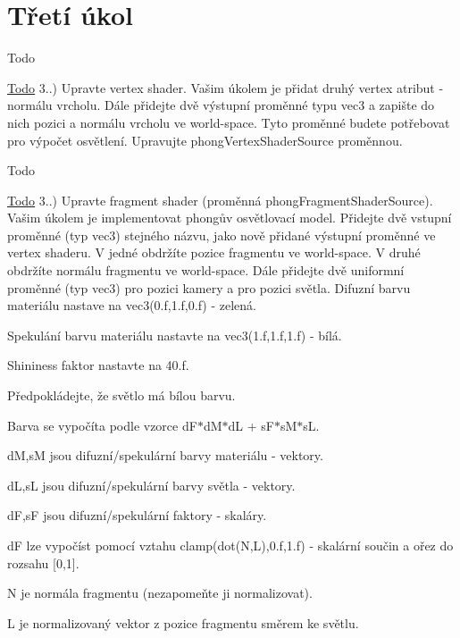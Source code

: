 \hypertarget{group__task3}{\section{Třetí úkol}
\label{group__task3}
}
\begin{DoxyRefDesc}{Todo}
\item[\hyperlink{todo__todo000002}{Todo}]3..) Upravte vertex shader. Vašim úkolem je přidat druhý vertex atribut -\/ normálu vrcholu. Dále přidejte dvě výstupní proměnné typu vec3 a zapište do nich pozici a normálu vrcholu ve world-\/space. Tyto proměnné budete potřebovat pro výpočet osvětlení. Upravujte phong\-Vertex\-Shader\-Source proměnnou. \end{DoxyRefDesc}


\begin{DoxyRefDesc}{Todo}
\item[\hyperlink{todo__todo000003}{Todo}]3..) Upravte fragment shader (proměnná phong\-Fragment\-Shader\-Source). Vašim úkolem je implementovat phongův osvětlovací model. Přidejte dvě vstupní proměnné (typ vec3) stejného názvu, jako nově přidané výstupní proměnné ve vertex shaderu. V jedné obdržíte pozice fragmentu ve world-\/space. V druhé obdržíte normálu fragmentu ve world-\/space. Dále přidejte dvě uniformní proměnné (typ vec3) pro pozici kamery a pro pozici světla. Difuzní barvu materiálu nastave na vec3(0.\-f,1.\-f,0.\-f) -\/ zelená.\par
 Spekulání barvu materiálu nastavte na vec3(1.\-f,1.\-f,1.\-f) -\/ bílá.\par
 Shininess faktor nastavte na 40.\-f.\par
 Předpokládejte, že světlo má bílou barvu.\par
 Barva se vypočíta podle vzorce d\-F$\ast$d\-M$\ast$d\-L + s\-F$\ast$s\-M$\ast$s\-L.\par
 d\-M,s\-M jsou difuzní/spekulární barvy materiálu -\/ vektory.\par
 d\-L,s\-L jsou difuzní/spekulární barvy světla -\/ vektory.\par
 d\-F,s\-F jsou difuzní/spekulární faktory -\/ skaláry.\par
 d\-F lze vypočíst pomocí vztahu clamp(dot(\-N,\-L),0.\-f,1.\-f) -\/ skalární součin a ořez do rozsahu \mbox{[}0,1\mbox{]}.\par
 N je normála fragmentu (nezapomeňte ji normalizovat).\par
 L je normalizovaný vektor z pozice fragmentu směrem ke světlu.\par

\end{DoxyRefDesc}
